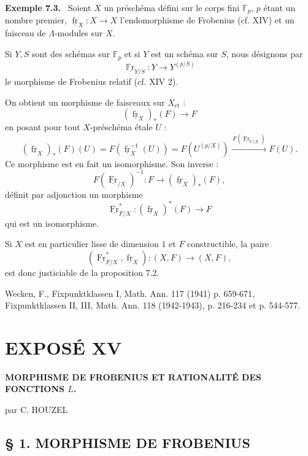 \documentclass[11pt]{article}
\newenvironment{statement}[1]{\par\medskip\noindent\textbf{#1.}\ }{\par\medskip}
\providecommand{\fr}{\operatorname{fr}}
\providecommand{\Fr}{\operatorname{Fr}}
\providecommand{\Fr}{\operatorname{Fr}}
\providecommand{\fr}{\operatorname{fr}}
\begin{document}
\renewcommand{\fr}{\underline{\operatorname{fr}}}\renewcommand{\Fr}{\underline{\operatorname{Fr}}}
\begin{statement}{Exemple 7.3}
Soient $X$ un préschéma défini sur le corps fini $\mathbb F_p$, $p$ étant un nombre premier, $\fr_X:X\to X$ l'endomorphisme de Frobenius (cf. XIV) et un faisceau de $\Lambda$-modules sur $X$.

Si $Y,S$ sont des schémas sur $\mathbb F_p$ et si $Y$ est un schéma sur $S$, nous désignons par
\[
\underline{\operatorname{\mathbb{F}r}}_{Y/S}:Y\longrightarrow Y^{(p/S)}
\]
le morphisme de Frobenius relatif (cf. XIV 2).

On obtient un morphisme de faisceaux sur $X_{\mathrm{et}}$ :
\[
(\fr_X)_*(F)\longrightarrow F
\]
en posant pour tout $X$-préschéma étale $U$ :
\[
(\fr_X)_*(F)(U)=F(\fr_X^{-1}(U))=F(U^{(p/X)})
 \xrightarrow{\,F(\Fr_{U/X})\,}F(U).
\]
Ce morphisme est en fait un isomorphisme. Son inverse :
\[
F(\Fr_{/X})^{-1}:F\longrightarrow (\fr_X)_*(F),
\]
définit par adjonction un morphisme
\[
\Fr_{F/X}^*:(\fr_X)^*(F)\longrightarrow F
\]
qui est un isomorphisme.

Si $X$ est en particulier lisse de dimension $1$ et $F$ constructible, la paire
\[
(\Fr_{F/X}^*,\fr_X):(X,F)\longrightarrow (X,F),
\]
est donc justiciable de la proposition 7.2.
\end{statement}

\noindent[1] Wecken, F., Fixpunktklassen I, Math. Ann. 117 (1941) p. 659-671, Fixpunktklassen II, III, Math. Ann. 118 (1942-1943), p. 216-234 et p. 544-577.

\section*{EXPOSÉ XV}
\renewcommand{\fr}{\underline{\underline{\operatorname{fr}}}}\renewcommand{\Fr}{\underline{\underline{\operatorname{Fr}}}}
\begin{center}
\Large\bfseries
MORPHISME DE FROBENIUS ET RATIONALITÉ DES FONCTIONS $L$.

\medskip
par C. HOUZEL
\end{center}

\subsection*{§ 1. MORPHISME DE FROBENIUS}
\end{document}
